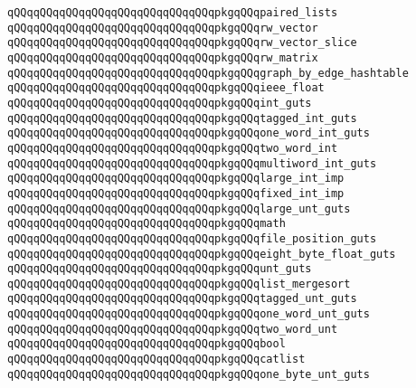 \verb|qQQqqQQqqQQqqQQqqQQqqQQqqQQqqQQqpkgqQQqpaired_lists|\newline
\verb|qQQqqQQqqQQqqQQqqQQqqQQqqQQqqQQqpkgqQQqrw_vector|\newline
\verb|qQQqqQQqqQQqqQQqqQQqqQQqqQQqqQQqpkgqQQqrw_vector_slice|\newline
\verb|qQQqqQQqqQQqqQQqqQQqqQQqqQQqqQQqpkgqQQqrw_matrix|\newline
\verb|qQQqqQQqqQQqqQQqqQQqqQQqqQQqqQQqpkgqQQqgraph_by_edge_hashtable|\newline
\verb|qQQqqQQqqQQqqQQqqQQqqQQqqQQqqQQqpkgqQQqieee_float|\newline
\verb|qQQqqQQqqQQqqQQqqQQqqQQqqQQqqQQqpkgqQQqint_guts|\newline
\verb|qQQqqQQqqQQqqQQqqQQqqQQqqQQqqQQqpkgqQQqtagged_int_guts|\newline
\verb|qQQqqQQqqQQqqQQqqQQqqQQqqQQqqQQqpkgqQQqone_word_int_guts|\newline
\verb|qQQqqQQqqQQqqQQqqQQqqQQqqQQqqQQqpkgqQQqtwo_word_int|\newline
\verb|qQQqqQQqqQQqqQQqqQQqqQQqqQQqqQQqpkgqQQqmultiword_int_guts|\newline
\verb|qQQqqQQqqQQqqQQqqQQqqQQqqQQqqQQqpkgqQQqlarge_int_imp|\newline
\verb|qQQqqQQqqQQqqQQqqQQqqQQqqQQqqQQqpkgqQQqfixed_int_imp|\newline
\verb|qQQqqQQqqQQqqQQqqQQqqQQqqQQqqQQqpkgqQQqlarge_unt_guts|\newline
\verb|qQQqqQQqqQQqqQQqqQQqqQQqqQQqqQQqpkgqQQqmath|\newline
\verb|qQQqqQQqqQQqqQQqqQQqqQQqqQQqqQQqpkgqQQqfile_position_guts|\newline
\verb|qQQqqQQqqQQqqQQqqQQqqQQqqQQqqQQqpkgqQQqeight_byte_float_guts|\newline
\verb|qQQqqQQqqQQqqQQqqQQqqQQqqQQqqQQqpkgqQQqunt_guts|\newline
\verb|qQQqqQQqqQQqqQQqqQQqqQQqqQQqqQQqpkgqQQqlist_mergesort|\newline
\verb|qQQqqQQqqQQqqQQqqQQqqQQqqQQqqQQqpkgqQQqtagged_unt_guts|\newline
\verb|qQQqqQQqqQQqqQQqqQQqqQQqqQQqqQQqpkgqQQqone_word_unt_guts|\newline
\verb|qQQqqQQqqQQqqQQqqQQqqQQqqQQqqQQqpkgqQQqtwo_word_unt|\newline
\verb|qQQqqQQqqQQqqQQqqQQqqQQqqQQqqQQqpkgqQQqbool|\newline
\verb|qQQqqQQqqQQqqQQqqQQqqQQqqQQqqQQqpkgqQQqcatlist|\newline
\verb|qQQqqQQqqQQqqQQqqQQqqQQqqQQqqQQqpkgqQQqone_byte_unt_guts|\newline
